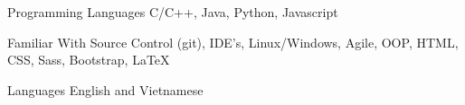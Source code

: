 
\begin{cvskills}


  \cvskill
  {Programming Languages}
  {C/C++, Java, Python, Javascript}

  \cvskill
  {Familiar With}
  {Source Control (git), IDE's, Linux/Windows, Agile, OOP, HTML, CSS, Sass, Bootstrap, LaTeX}

  \cvskill
  {Languages}
  {English and Vietnamese}

  
\end{cvskills}
